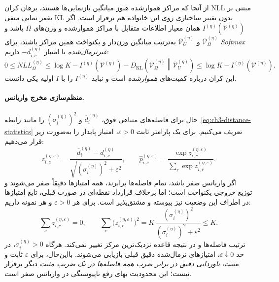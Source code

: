 از آنجا که مراکز هموارشده هنوز میانگین
بازنمایی‌ها هستند، برهان کران NLL
مبتنی بر تقعر نمایی منفی KL
بدون تغییر ساختاری روی این خانواده
هم برقرار است. اگر
$I^{(\eta)}(\mathcal V^{(\eta)})$
همان معیار اطلاعات متقابل با
مراکز هموارشده و وزن‌های $\Omega$ باشد و
$\overline{\mathcal V}^{(\eta)}_{\Omega}$
و $\overline{\mathcal V}^{(\eta)}_U$
به‌ترتیب میانگین وزن‌دار و یکنواخت
همین مراکز باشند، برای
\emph{Softmax غیرنرمال‌شده}
با امتیاز $-d_{i,c}^{(\eta)}$ داریم:
\begin{equation}\label{eq:ch3-stable-NLL-I-bound}
\boxed{
0\le NLL_\Omega^{(\eta)}
\le \log K-I^{(\eta)}(\mathcal V^{(\eta)})
-D_{\mathrm{KL}}\!\left(
\overline{\mathcal V}^{(\eta)}_{\Omega}
\middle\|\overline{\mathcal V}^{(\eta)}_U
\right)
\le\log K-I^{(\eta)}(\mathcal V^{(\eta)}).
}
\end{equation}
این کران درباره کمیت‌های \emph{هموارشده}
است و نباید $I^{(\eta)}$ را با $I$
اولیه یکی دانست.

\paragraph{منظم‌سازی مخرج واریانس.}
حال برای فاصله‌های متناهی فوق،
$\overline d_i^{(\eta)}$ و
$(\sigma_i^{(\eta)})^2$
را مانند رابطه~\eqref{eq:ch3-distance-statistics}
تعریف می‌کنیم. برای یک پارامتر ثابت
$\varepsilon>0$، امتیاز پایدار را
به‌صورت زیر قرار می‌دهیم:
\begin{equation}\label{eq:ch3-stable-normalized-score}
\boxed{
z_{i,c}^{(\eta,\varepsilon)}
=\frac{\overline d_i^{(\eta)}-d_{i,c}^{(\eta)}}
{\sqrt{(\sigma_i^{(\eta)})^2+\varepsilon^2}},
\qquad
\widehat p_{i,c}^{(\eta,\varepsilon)}
=\frac{\exp z_{i,c}^{(\eta,\varepsilon)}}
{\sum_r\exp z_{i,r}^{(\eta,\varepsilon)}}.
}
\end{equation}
اگر واریانس صفر باشد، تمام فاصله‌ها
برابرند، همه امتیازها دقیقاً صفر می‌شوند
و توزیع خروجی یکنواخت است؛
اما برخلاف قرارداد نقطه‌ای
در صورت قبلی، تابع امتیازها
در اطراف این وضعیت نیز پیوسته و
مشتق‌پذیر است. برای هر $\varepsilon>0$
و هر نمونه داریم:
\[
\sum_cz_{i,c}^{(\eta,\varepsilon)}=0,
\qquad
\sum_c\bigl(z_{i,c}^{(\eta,\varepsilon)}\bigr)^2
=K\,\frac{(\sigma_i^{(\eta)})^2}
{(\sigma_i^{(\eta)})^2+\varepsilon^2}\le K.
\]
ترتیب فاصله‌ها و در نتیجه
قاعده نزدیک‌ترین مرکز تغییر نمی‌کند.
هرگاه $\sigma_i^{(\eta)}>0$،
در حد $\varepsilon\downarrow0$،
امتیازهای نرمال‌شده دقیق قبلی
بازیابی می‌شوند. بااین‌حال،
برای $\varepsilon$ ثابت و مثبت،
\emph{ناوردایی دقیق در برابر ضرب همه
فاصله‌ها در یک ضریب مثبت}
دیگر برقرار نیست؛ این محدودیت
بهای رفع ناپیوستگی در واریانس صفر است.

